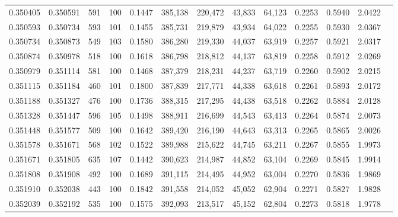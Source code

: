 \begin{tabular}{rrrrrrrrrrrrr}
0.350405 & 0.350591 &   591 & 100 &                                     0.1447 & 385,138 & 220,472 &  43,833 &  64,123 & 0.2253 & 0.5940 & 2.0422 \\
0.350593 & 0.350734 &   593 & 101 &                                     0.1455 & 385,731 & 219,879 &  43,934 &  64,022 & 0.2255 & 0.5930 & 2.0367 \\
0.350734 & 0.350873 &   549 & 103 &                                     0.1580 & 386,280 & 219,330 &  44,037 &  63,919 & 0.2257 & 0.5921 & 2.0317 \\
0.350874 & 0.350978 &   518 & 100 &                                     0.1618 & 386,798 & 218,812 &  44,137 &  63,819 & 0.2258 & 0.5912 & 2.0269 \\
0.350979 & 0.351114 &   581 & 100 &                                     0.1468 & 387,379 & 218,231 &  44,237 &  63,719 & 0.2260 & 0.5902 & 2.0215 \\
0.351115 & 0.351184 &   460 & 101 &                                     0.1800 & 387,839 & 217,771 &  44,338 &  63,618 & 0.2261 & 0.5893 & 2.0172 \\
0.351188 & 0.351327 &   476 & 100 &                                     0.1736 & 388,315 & 217,295 &  44,438 &  63,518 & 0.2262 & 0.5884 & 2.0128 \\
0.351328 & 0.351447 &   596 & 105 &                                     0.1498 & 388,911 & 216,699 &  44,543 &  63,413 & 0.2264 & 0.5874 & 2.0073 \\
0.351448 & 0.351577 &   509 & 100 &                                     0.1642 & 389,420 & 216,190 &  44,643 &  63,313 & 0.2265 & 0.5865 & 2.0026 \\
0.351578 & 0.351671 &   568 & 102 &                                     0.1522 & 389,988 & 215,622 &  44,745 &  63,211 & 0.2267 & 0.5855 & 1.9973 \\
0.351671 & 0.351805 &   635 & 107 &                                     0.1442 & 390,623 & 214,987 &  44,852 &  63,104 & 0.2269 & 0.5845 & 1.9914 \\
0.351808 & 0.351908 &   492 & 100 &                                     0.1689 & 391,115 & 214,495 &  44,952 &  63,004 & 0.2270 & 0.5836 & 1.9869 \\
0.351910 & 0.352038 &   443 & 100 &                                     0.1842 & 391,558 & 214,052 &  45,052 &  62,904 & 0.2271 & 0.5827 & 1.9828 \\
0.352039 & 0.352192 &   535 & 100 &                                     0.1575 & 392,093 & 213,517 &  45,152 &  62,804 & 0.2273 & 0.5818 & 1.9778 \\

\end{tabular}
